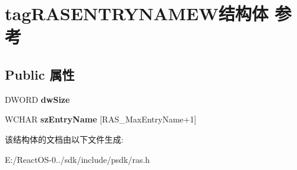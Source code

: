 \hypertarget{structtag_r_a_s_e_n_t_r_y_n_a_m_e_w}{}\section{tag\+R\+A\+S\+E\+N\+T\+R\+Y\+N\+A\+M\+E\+W结构体 参考}
\label{structtag_r_a_s_e_n_t_r_y_n_a_m_e_w}
\subsection*{Public 属性}
\begin{DoxyCompactItemize}
\item 
\mbox{\label{structtag_r_a_s_e_n_t_r_y_n_a_m_e_w_ab7112e627544a49519feaacd9c57c584}} 
D\+W\+O\+RD {\bfseries dw\+Size}
\item 
\mbox{\label{structtag_r_a_s_e_n_t_r_y_n_a_m_e_w_aa8c6677d9bd714ce354ef50b4a113aa7}} 
W\+C\+H\+AR {\bfseries sz\+Entry\+Name} \mbox{[}R\+A\+S\+\_\+\+Max\+Entry\+Name+1\mbox{]}
\end{DoxyCompactItemize}


该结构体的文档由以下文件生成\+:\begin{DoxyCompactItemize}
\item 
E\+:/\+React\+O\+S-\/0../sdk/include/psdk/ras.\+h\end{DoxyCompactItemize}

